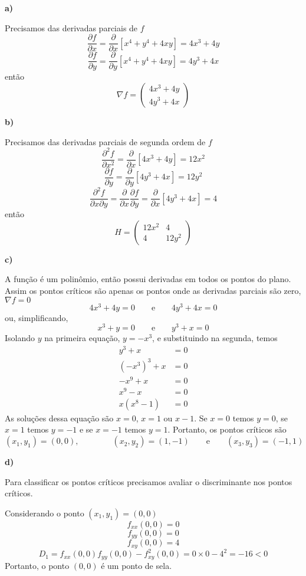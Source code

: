 \documentclass[a4paper,12pt,fleqn]{article}
\newcommand{\D}[2]{\frac{\partial {#1}}{\partial {#2}}}
\newcommand{\DS}[2]{\frac{\partial^2 {#1}}{\partial {#2}^2}}
\newcommand{\DM}[3]{\frac{\partial^2 {#1}}{\partial {#2} \partial {#3}}}
\newcommand{\vetor}[2]{\left(\begin{array}{c} #1 \\ #2 \end{array}\right)}
\begin{document}
\begin{answer}
  \noindent\textbf{a)}

  Precisamos das derivadas parciais de $f$
  \[
    \D{f}{x}
    = \D{}{x}\left[x^4 + y^4 + 4xy\right]
    = 4x^3 + 4y
  \]
  \[
    \D{f}{y}
    = \D{}{y}\left[x^4 + y^4 + 4xy\right]
    = 4y^3 + 4x
  \]
  então
  \[
    \nabla f = \vetor{4x^3 + 4y}{4y^3 + 4x}
  \]

  \noindent\textbf{b)}

  Precisamos das derivadas parciais de segunda ordem de $f$
  \[
    \DS{f}{x}
    = \D{}{x}\left[4x^3 + 4y\right]
    = 12x^2
  \]
  \[
    \D{f}{y}
    = \D{}{y}\left[4y^3 + 4x\right]
    = 12y^2
  \]
  \[
    \DM{f}{x}{y}
    = \D{}{x}\D{f}{y}
    = \D{}{x}\left[4y^3 + 4x\right]
    = 4
  \]
  então
  \[
    H = \left(\begin{array}{cc}
      12x^2 & 4 \\
      4 & 12y^2
    \end{array}\right)
  \]

  \noindent\textbf{c)}

  A função é um polinômio, então possui derivadas em todos os pontos do plano.
  Assim os pontos críticos são apenas os pontos onde as derivadas parciais são zero,
  \(\nabla f = 0\)
  \[
    4x^3 + 4y = 0
    \qquad\text{e}\qquad
    4y^3 + 4x = 0
  \]
  ou, simplificando,
  \[
    x^3 + y = 0
    \qquad\text{e}\qquad
    y^3 + x = 0
  \]
  Isolando $y$ na primeira equação, \(y = -x^3\), e substituindo na segunda, temos
  \begin{align*}
    y^3 + x                 & = 0 \\
    \left(-x^3\right)^3 + x & = 0 \\
    -x^9 + x                & = 0 \\
    x^9 - x                 & = 0 \\
    x(x^8 - 1)              & = 0
  \end{align*}
  As soluções dessa equação são $x=0$, $x=1$ ou $x-1$.
  Se $x=0$ temos $y=0$,
  se $x=1$ temos $y=-1$ e
  se $x=-1$ temos $y=1$.
  Portanto, os pontos críticos são
  \[
    (x_1, y_1) = (0, 0),
    \qquad\qquad
    (x_2, y_2) = (1, -1)
    \qquad\text{e}\qquad
    (x_3, y_3) = (-1, 1)
  \]

  \noindent\textbf{d)}

  Para classificar os pontos críticos precisamos avaliar o discriminante nos
  pontos críticos.

  Considerando o ponto \((x_1, y_1) = (0, 0)\)
  \[
    f_{xx}(0, 0) = 0
  \]
  \[
    f_{yy}(0, 0) = 0
  \]
  \[
    f_{xy}(0, 0) = 4
  \]
  \[
    D_1
    = f_{xx}(0, 0)f_{yy}(0, 0) - f^2_{xy}(0, 0)
    = 0 \times 0 - 4^2
    = -16 < 0
  \]
  Portanto, o ponto $(0, 0)$ é um ponto de sela.


\end{answer}
\end{document}
